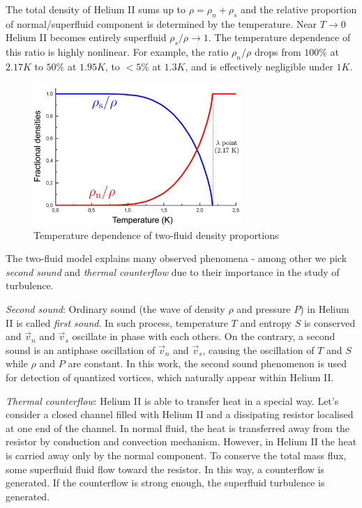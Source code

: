 	The total density of Helium II sums up to $\rho = \rho_n + \rho_s$ and the relative proportion of normal/superfluid component is determined by the temperature. Near $T \rightarrow 0$ Helium II becomes entirely superfluid $\rho_s/\rho \rightarrow 1$. The temperature dependence of this ratio is highly nonlinear. For example, the ratio $\rho_n/\rho$ drops from $100\%$ at $2.17\unit{K}$ to $50\%$ at $1.95\unit{K}$, to $<5\%$ at $1.3\unit{K}$, and is effectively negligible under $1\unit{K}$.

	\begin{figure}[h]
		\centering
		\includegraphics[width=0.7\textwidth]{graphics/theory/densities}
		\caption{Temperature dependence of two-fluid density proportions}
		\label{densities}
	\end{figure}

	The two-fluid model explains many observed phenomena - among other we pick \textit{second sound} and \textit{thermal counterflow} due to their importance in the study of turbulence.

	\textit{Second sound}: Ordinary sound (the wave of density $\rho$ and pressure $P$) in Helium II is called \textit{first sound}. In such process, temperature $T$ and entropy $S$ is conserved and $\vec{v}_n$ and $\vec{v}_s$ oscillate in phase with each others. On the contrary, a second sound is an antiphase oscillation of $\vec{v}_n$ and $\vec{v}_s$, causing the oscillation of $T$ and $S$ while $\rho$ and $P$ are constant. In this work, the second sound phenomenon is used for detection of quantized vortices, which naturally appear within Helium II.

	\textit{Thermal counterflow}: Helium II is able to transfer heat in a special way. Let's consider a closed channel filled with Helium II and a dissipating resistor localised at one end of the channel. In normal fluid, the heat is transferred away from the resistor by conduction and convection mechanism. However, in Helium II the heat is carried away only by the normal component. To conserve the total mass flux, some superfluid fluid flow toward the resistor. In this way, a counterflow is generated. If the counterflow is strong enough, the superfluid turbulence is generated.

